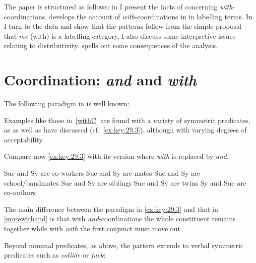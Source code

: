\documentclass[output=paper]{langsci/langscibook}
\begin{document}
The paper is structured as follows: in  I present the
facts of  concerning \emph{with}-coordinations. 
develops the account of \emph{with}-coordinations in  in labelling
terms. In  I turn to the  data and show that the
patterns follow from the simple proposal that  \emph{me} (with) is a
labelling category. I also discuss some interpretive issues relating to
distributivity.  spells out some consequences of the
analysis.

\section{Coordination: \emph{and} and \emph{with}}\label{secdata}

The following paradigm in  is well known:

\ea\label{andC}
    \label{andCa}
    \label{andCb}
    \z
\z

\ea\label{withC}
    \label{withCa}
    \label{withCb}
    \z
\z

Examples like those in~\eqref{withC} are found with a variety of symmetric
predicates, as \citet{lakoff-peters:69} as well as \citet{dong:70} have
discussed (cf.\ \eqref{ex:key:29.3}), although with varying degrees of
acceptability.

\ea\label{ex:key:29.3}
    \z
\z

Compare now \eqref{ex:key:29.3} with its version where \emph{with} is replaced by
\emph{and}.

\ea\label{morewithand}
    \ea Sue and Sy are co-workers
    \ex Sue and Sy are mates
    \ex Sue and Sy are school/bandmates
    \ex Sue and Sy are siblings
    \ex Sue and Sy are twins
    \ex Sy and Sue are co-authors
    \z
\z

The main difference between the paradigm in \eqref{ex:key:29.3} and that in
\eqref{morewithand} is that with \emph{and}-coordinations the whole constituent
remains together while with \emph{with} the first conjunct must move out.

Beyond nominal predicates, as above, the pattern extends to verbal symmetric
predicates such as \emph{collide} or \emph{fuck}:
\end{document}
